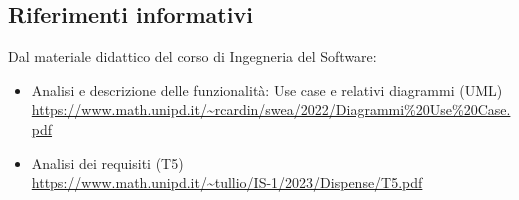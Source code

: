 \subsection{Riferimenti informativi}\label{sec:riferimenti_informativi}
Dal materiale didattico del corso di Ingegneria del Software:
\begin{itemize}
    \item Analisi e descrizione delle funzionalità: Use case e relativi diagrammi (UML) \\
    \url{https://www.math.unipd.it/~rcardin/swea/2022/Diagrammi%20Use%20Case.pdf}
    \item Analisi dei requisiti (T5) \\
    \url{https://www.math.unipd.it/~tullio/IS-1/2023/Dispense/T5.pdf}
\end{itemize}
